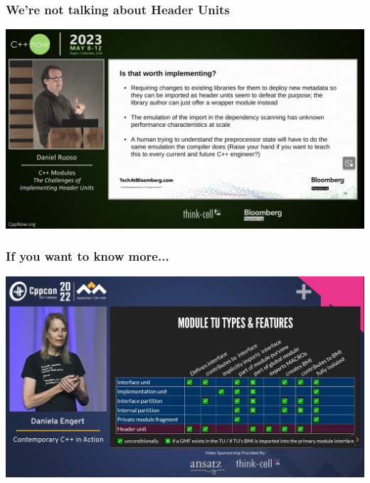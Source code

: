 \documentclass[aspectratio=169]{beamer}
\begin{document}
\begin{frame}
  \frametitle{We're not talking about Header Units}
  
  \begin{center}
    \href{https://www.youtube.com/watch?v=_LGR0U5Opdg}
    {\includegraphics[height=.8\textheight]{modulesgfx/ruoso_header_units.jpg}}
  \end{center}
\end{frame}

\begin{frame}
  \frametitle{If you want to know more...}
  \begin{center}
    \includegraphics[height=.8\textheight]{modulesgfx/engert_table.jpg}
  \end{center}
\end{frame}
\end{document}
